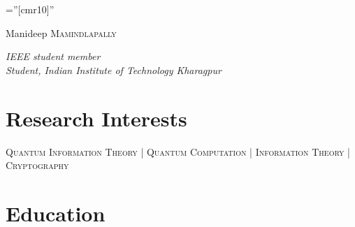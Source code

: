 \documentclass[a4paper,10pt]{article}
\def \siteurl{https://manideepmamindlapally.ninja}
\begin{document}


\pagestyle{empty} %

\font\fb=''[cmr10]'' %


\par{\centering
		{\Huge Manideep \textsc{Mamindlapally}
	}\par}



\par{\centering
		{ \textit{IEEE student member} \\ \textit{Student, Indian Institute of Technology Kharagpur}
		}\par
	}
	
	\par{ \centering
\href{https://scholar.google.com/citations?hl=en&user=w-PmSxAAAAAJ}{\textcolor{black}{\faGraduationCap}}
\href{https://github.com/manideepmamindlapally}{\textcolor{black}{\faGithubSquare}}
\href{https://www.linkedin.com/in/manideep-mamindlapally}{\textcolor{black}{\faLinkedin}}
\href{\siteurl}{\textcolor{black}{\faGlobe}}
\href{https://twitter.com/manideepyx}{\textcolor{black}{\faTwitter}}
\href{mailto:manideepyx@iitkgp.ac.in}{\textcolor{black}{\faEnvelope}}
\href{tel:+919515399302}{\textcolor{black}{\faPhoneSquare*}}
\par}

\section{Research Interests}
\centering
\textsc{Quantum Information Theory} | \textsc{Quantum Computation} | \textsc{Information Theory} | \textsc{Cryptography}
\section{Education}
\end{document}
